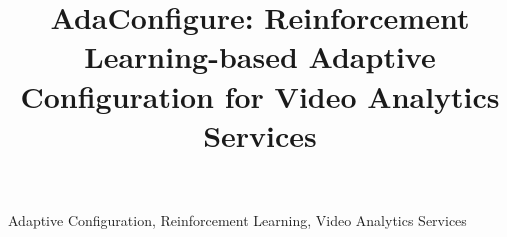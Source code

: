 \documentclass{article}
\begin{document}
\sloppy

\def\x{{\mathbf x}}
\def\L{{\cal L}}

\title{AdaConfigure: Reinforcement Learning-based Adaptive Configuration for Video Analytics Services}

%
\address{}

\maketitle


\begin{keywords}
Adaptive Configuration,  Reinforcement Learning, Video Analytics Services
\end{keywords}



%






\end{document}
